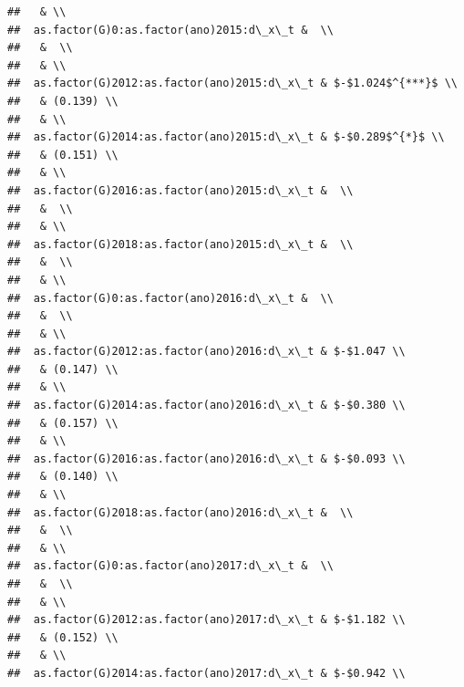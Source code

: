 \documentclass[
]{article}
\begin{document}
\begin{verbatim}
##   & \\ 
##  as.factor(G)0:as.factor(ano)2015:d\_x\_t &  \\ 
##   &  \\ 
##   & \\ 
##  as.factor(G)2012:as.factor(ano)2015:d\_x\_t & $-$1.024$^{***}$ \\ 
##   & (0.139) \\ 
##   & \\ 
##  as.factor(G)2014:as.factor(ano)2015:d\_x\_t & $-$0.289$^{*}$ \\ 
##   & (0.151) \\ 
##   & \\ 
##  as.factor(G)2016:as.factor(ano)2015:d\_x\_t &  \\ 
##   &  \\ 
##   & \\ 
##  as.factor(G)2018:as.factor(ano)2015:d\_x\_t &  \\ 
##   &  \\ 
##   & \\ 
##  as.factor(G)0:as.factor(ano)2016:d\_x\_t &  \\ 
##   &  \\ 
##   & \\ 
##  as.factor(G)2012:as.factor(ano)2016:d\_x\_t & $-$1.047 \\ 
##   & (0.147) \\ 
##   & \\ 
##  as.factor(G)2014:as.factor(ano)2016:d\_x\_t & $-$0.380 \\ 
##   & (0.157) \\ 
##   & \\ 
##  as.factor(G)2016:as.factor(ano)2016:d\_x\_t & $-$0.093 \\ 
##   & (0.140) \\ 
##   & \\ 
##  as.factor(G)2018:as.factor(ano)2016:d\_x\_t &  \\ 
##   &  \\ 
##   & \\ 
##  as.factor(G)0:as.factor(ano)2017:d\_x\_t &  \\ 
##   &  \\ 
##   & \\ 
##  as.factor(G)2012:as.factor(ano)2017:d\_x\_t & $-$1.182 \\ 
##   & (0.152) \\ 
##   & \\ 
##  as.factor(G)2014:as.factor(ano)2017:d\_x\_t & $-$0.942 \\ 

\end{verbatim}
\end{document}
